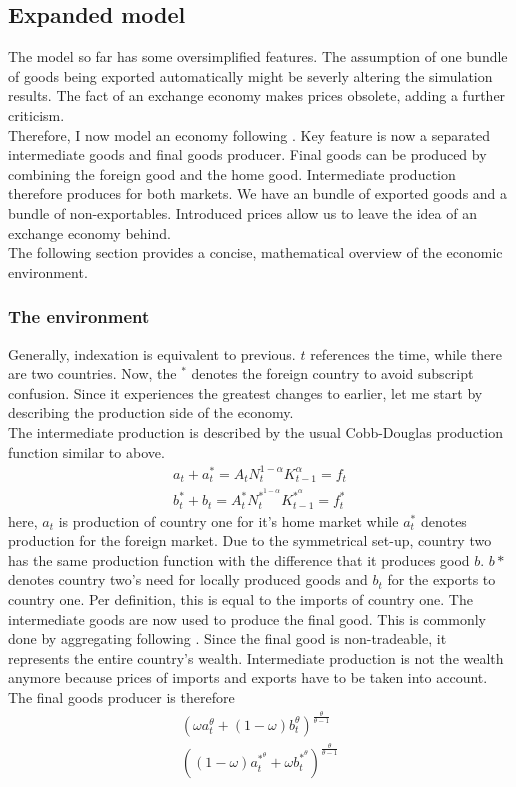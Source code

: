 \documentclass{article}
\begin{document}
\subsection{Expanded model}

The model so far has some oversimplified features. The assumption of one bundle of goods being exported automatically might be severly altering the simulation results. The fact of an exchange economy makes prices obsolete, adding a further criticism.\\
Therefore, I now model an economy following \cite{backus1992international}. Key feature is now a separated intermediate goods and final goods producer. Final goods can be produced by combining the foreign good and the home good. Intermediate production therefore produces for both markets. We have an bundle of exported goods and a bundle of non-exportables. Introduced prices allow us to leave the idea of an exchange economy behind. \\
The following section provides a concise, mathematical overview of the economic environment.

\subsubsection{The environment}

Generally, indexation is equivalent to previous. $t$ references the time, while there are two countries. Now, the $^{*}$ denotes the foreign country to avoid subscript confusion. Since it experiences the greatest changes to earlier, let me start by describing the production side of the economy.\\
The intermediate production is described by the usual Cobb-Douglas production function similar to above.
\begin{align}
a_t + a_t^* = A_t N_t^{1-\alpha} K_{t-1}^{\alpha} = f_t \\
b_t^* + b_t = A_t^* N_t^{*^{ 1-\alpha}} K_{t-1}^{*^{\alpha}} = f_t^*
\end{align}
here, $a_t$ is production of country one for it's home market while $a_t^*$ denotes production for the foreign market. Due to the symmetrical set-up, country two has the same production function with the difference that it produces good $b$. $b*$ denotes country two's need for locally produced goods and $b_t$ for the exports to country one. Per definition, this is equal to the imports of country one.
The intermediate goods are now used to produce the final good. This is commonly done by aggregating following \cite{armington1969theory}. Since the final good is non-tradeable, it represents the entire country's wealth. Intermediate production is not the wealth anymore because prices of imports and exports have to be taken into account. The final goods producer is therefore
\begin{align}
(\omega a_t^\theta + (1-\omega) b_t^\theta)^{\frac{\theta}{\theta-1}} \\
((1-\omega) a_t^{*^{\theta}} + \omega b_t^{*^{\theta}})^{\frac{\theta}{\theta-1}}
\end{align}
\end{document}
